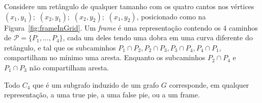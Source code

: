 \begin{definition} \label{defi:tortasFrame2}
 Considere um retângulo de qualquer tamanho com os quatro cantos nos vértices  $ (x_1, y_1);$ $(x_2, y_1);$ $(x_2, y_2);$ $(x_1, y_2)$, posicionado como na Figura~\ref{fig:frameInGrid}. Um \emph{frame} é uma representação contendo os 4 caminhos de $\mathcal{P} =  \{ P_1, \dots, P_4\} $, cada um deles tendo uma dobra em uma curva diferente do retângulo, e tal que os subcaminhos $ P_1 \cap P_2, P_2 \cap P_3, P_3 \cap P_4, P_4 \cap P_1 $, compartilham no mínimo uma aresta. Enquanto os subcaminhos  $ P_2 \cap P_4 $ e $ P_1 \cap P_3 $ não compartilham aresta.


\end{definition}


%


\begin{lema}\label{lem:representacaoC4}
\cite{golumbic2009} Todo $C_4$ que é um subgrafo induzido de um grafo $ G $ corresponde, em qualquer representação, a uma true pie, a uma false pie, ou a um frame.
\end{lema}



